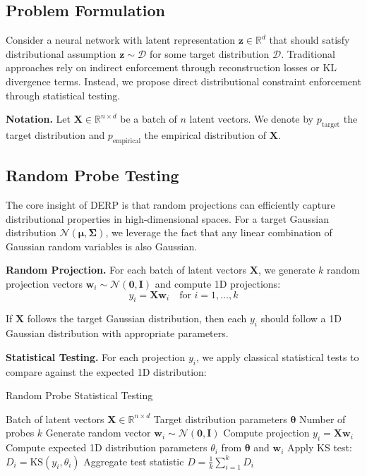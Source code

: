 \documentclass{article}
\begin{document}
\subsection{Problem Formulation}

Consider a neural network with latent representation $\mathbf{z} \in \mathbb{R}^d$ that should satisfy distributional assumption $\mathbf{z} \sim \mathcal{D}$ for some target distribution $\mathcal{D}$. Traditional approaches rely on indirect enforcement through reconstruction losses or KL divergence terms. Instead, we propose direct distributional constraint enforcement through statistical testing.

\textbf{Notation.} Let $\mathbf{X} \in \mathbb{R}^{n \times d}$ be a batch of $n$ latent vectors. We denote by $p_{\text{target}}$ the target distribution and $p_{\text{empirical}}$ the empirical distribution of $\mathbf{X}$.

\subsection{Random Probe Testing}

The core insight of DERP is that random projections can efficiently capture distributional properties in high-dimensional spaces. For a target Gaussian distribution $\mathcal{N}(\boldsymbol{\mu}, \boldsymbol{\Sigma})$, we leverage the fact that any linear combination of Gaussian random variables is also Gaussian.

\textbf{Random Projection.} For each batch of latent vectors $\mathbf{X}$, we generate $k$ random projection vectors $\mathbf{w}_i \sim \mathcal{N}(\mathbf{0}, \mathbf{I})$ and compute 1D projections:
\begin{equation}
y_i = \mathbf{X} \mathbf{w}_i \quad \text{for } i = 1, \ldots, k
\end{equation}

If $\mathbf{X}$ follows the target Gaussian distribution, then each $y_i$ should follow a 1D Gaussian distribution with appropriate parameters.

\textbf{Statistical Testing.} For each projection $y_i$, we apply classical statistical tests to compare against the expected 1D distribution:

\begin{algorithm}[tb]
\caption{Random Probe Statistical Testing}
\label{alg:random_probe}
\begin{algorithmic}[1]
\REQUIRE Batch of latent vectors $\mathbf{X} \in \mathbb{R}^{n \times d}$
\REQUIRE Target distribution parameters $\boldsymbol{\theta}$
\REQUIRE Number of probes $k$
    \STATE Generate random vector $\mathbf{w}_i \sim \mathcal{N}(\mathbf{0}, \mathbf{I})$
    \STATE Compute projection $y_i = \mathbf{X} \mathbf{w}_i$
    \STATE Compute expected 1D distribution parameters $\theta_i$ from $\boldsymbol{\theta}$ and $\mathbf{w}_i$
    \STATE Apply KS test: $D_i = \text{KS}(y_i, \theta_i)$
\ENDFOR
\RETURN Aggregate test statistic $D = \frac{1}{k} \sum_{i=1}^k D_i$
\end{algorithmic}
\end{algorithm}
\end{document}
